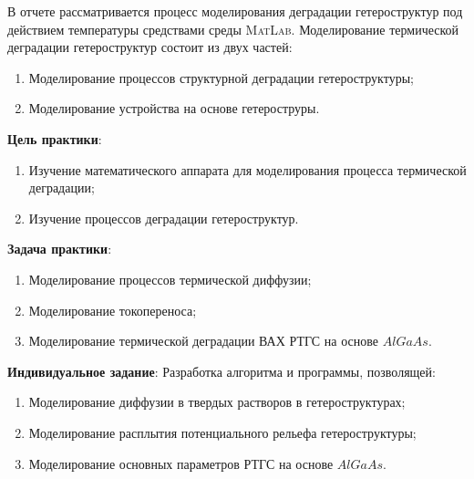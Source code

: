 \Introduction
В отчете рассматривается процесс моделирования деградации гетероструктур под действием температуры средствами среды \textsc{MatLab}. Моделирование термической деградации гетероструктур состоит из двух частей:
\begin{enumerate}
	\item Моделирование процессов структурной деградации гетероструктуры;
	\item Моделирование устройства на основе гетероструры.
\end{enumerate}
\textbf{Цель практики}:
\begin{enumerate}
	\item Изучение математического аппарата для моделирования процесса термической деградации;
	\item Изучение процессов деградации гетероструктур.
\end{enumerate}

\textbf{Задача практики}:
\begin{enumerate}
	\item Моделирование процессов термической диффузии;
	\item Моделирование токопереноса;
	\item Моделирование термической деградации ВАХ РТГС на основе $AlGaAs$.
\end{enumerate}

\textbf{Индивидуальное задание}: Разработка алгоритма и программы, позволящей:
\begin{enumerate}
	\item Моделирование диффузии в твердых растворов в гетероструктурах;
	\item Моделирование расплытия потенциального рельефа гетероструктуры;
	\item Моделирование основных параметров РТГС на основе $AlGaAs$.
\end{enumerate}
